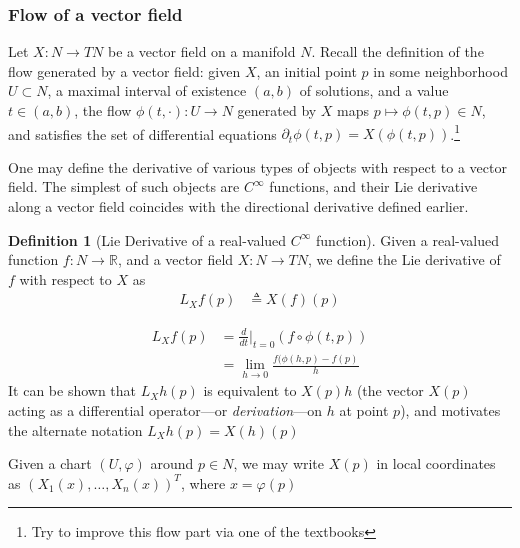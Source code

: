 \documentclass[psamsfonts]{amsart}
\theoremstyle{definition}
\newtheorem{defn}[thm]{Definition}
\theoremstyle{remark}
\newcommand*\R{\mathds{R}}
\numberwithin{equation}{section}
\begin{document}
\subsubsection{Flow of a vector field}
Let $X: N \rightarrow TN$ be a vector field on a manifold $N$. Recall the definition of the flow
generated by a vector field: given $X$, an initial point $p$ in some neighborhood $U\subset N$, a maximal interval of existence $(a, b)$ of solutions, and a value $t\in (a,b)$, the flow $\phi(t, \cdot): U \rightarrow N$ generated by $X$ maps $p \mapsto \phi(t, p)\in N$, and satisfies the set of differential equations $\partial_t\phi(t, p) = X(\phi(t, p))$.\footnote{{\color{red} Try to improve this flow part via one of the textbooks}}

One may define the derivative of various types of objects with respect to a vector field. The simplest of such objects are $C^{\infty}$ functions, and their Lie derivative along a vector field coincides with the directional derivative defined earlier. 

\begin{defn}[Lie Derivative of a real-valued $C^{\infty}$ function]
Given a real-valued function $f: N \rightarrow \R$, and a vector field $X: N\rightarrow TN$, we define the Lie derivative of $f$ with respect to $X$ as
\begin{align}
L_Xf(p) &\triangleq {} X(f)(p) 
\end{align}
\end{defn}

\begin{equation}
\begin{aligned}
L_Xf(p) &={}\frac{d}{dt}\biggr|_{t=0}\left( f \circ \phi(t, p)  \right)\\
&={} \lim_{h\rightarrow 0}\frac{f(\phi(h, p)-f(p)}{h}
\end{aligned}
\end{equation}
It can be shown that $L_Xh(p)$ is equivalent to $X(p)h$ (the vector $X(p)$ acting as a differential operator---or \textit{derivation}---on $h$ at point $p$), and motivates the alternate notation $L_Xh(p) = X(h)(p)$

Given a chart $(U, \varphi)$ around $p\in N$, we may write $X(p)$ in local coordinates as $(X_1(x), \dots, X_n(x))^T$, where $x = \varphi(p)$
\end{document}
